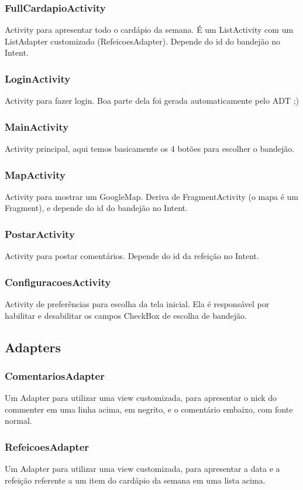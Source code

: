 \subsubsection{FullCardapioActivity}
Activity para apresentar todo o cardápio da semana. É um ListActivity com um ListAdapter customizado (RefeicoesAdapter).
Depende do id do bandejão no Intent.

\subsubsection{LoginActivity}
Activity para fazer login. Boa parte dela foi gerada automaticamente pelo ADT ;)

\subsubsection{MainActivity}
Activity principal, aqui temos basicamente os 4 botões para escolher o bandejão.

\subsubsection{MapActivity}
Activity para mostrar um GoogleMap. Deriva de FragmentActivity (o mapa é um Fragment), e depende do id do bandejão no Intent.

\subsubsection{PostarActivity}
Activity para postar comentários. Depende do id da refeição no Intent.

\subsubsection{ConfiguracoesActivity}
Activity de preferências para escolha da tela inicial. Ela é responsável por habilitar e desabilitar os campos CheckBox de escolha de bandejão.

\subsection{Adapters}
\subsubsection{ComentariosAdapter}
Um Adapter para utilizar uma view customizada, para apresentar o nick do commenter em uma linha acima, em negrito, e o comentário embaixo, com fonte normal.
\subsubsection{RefeicoesAdapter}
Um Adapter para utilizar uma view customizada, para apresentar a data e a refeição referente a um item do cardápio da semana em uma lista acima.

